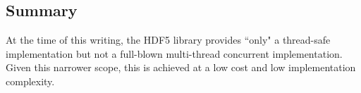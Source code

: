 

\subsection{Summary}

At the time of this writing, the HDF5 library provides ``only" a thread-safe implementation but not a full-blown multi-thread concurrent implementation. Given this narrower scope, this is achieved at a low cost and low implementation complexity.